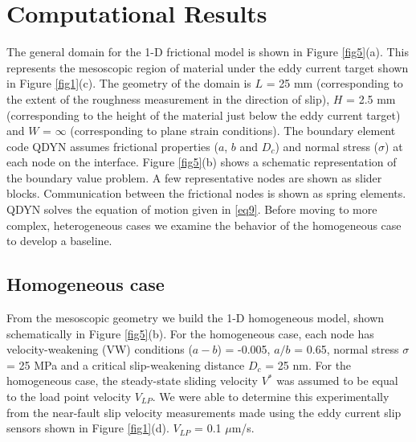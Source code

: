 \documentclass[preprint,1p, 10pt,authoryear]{elsarticle}
\begin{document}
\section{Computational Results}

The general domain for the 1-D frictional model is shown in Figure \ref{fig5}(a). This represents the mesoscopic region of material under the eddy current target shown in Figure \ref{fig1}(c). The geometry of the domain is $L$ = 25 mm (corresponding to the extent of the roughness measurement in the direction of slip), $H$ = 2.5 mm (corresponding to the height of the material just below the eddy current target) and $W$ = $\infty$ (corresponding to plane strain conditions). The boundary element code QDYN assumes frictional properties ($a$, $b$ and $D_{c}$) and normal stress ($\sigma$) at each node on the interface. Figure \ref{fig5}(b) shows a schematic representation of the boundary value problem. A few representative nodes are shown as slider blocks. Communication between the frictional nodes is shown as spring elements. QDYN  solves the equation of motion given in \eqref{eq9}. Before moving to more complex, heterogeneous cases we examine the behavior of the homogeneous case to develop a baseline.    

\subsection{Homogeneous case}
From the mesoscopic geometry we build the 1-D homogeneous model, shown schematically in Figure \ref{fig5}(b). For the homogeneous case, each node has velocity-weakening (VW) conditions ($a-b$) = -0.005, $a/b$ = 0.65, normal stress $\sigma$ = 25 MPa and a critical slip-weakening distance $D_{c}$ = 25 nm. For the homogeneous case, the steady-state sliding velocity $V^{*}$ was assumed to be equal to the load point velocity $V_{LP}$. We were able to determine this experimentally from the near-fault slip velocity measurements made using the eddy current slip sensors shown in Figure \ref{fig1}(d). $V_{LP}$ = 0.1 $\mu$m/s.
\end{document}
